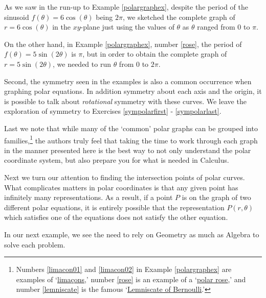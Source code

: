 \documentclass{ximera}
\begin{document}
As we saw in the run-up to Example \ref{polargraphex}, despite the period of the sinusoid  $f(\theta) = 6\cos(\theta)$ being $2\pi$, we sketched the complete graph of $r = 6\cos(\theta)$ in the $xy$-plane just using the values of $\theta$ as $\theta$ ranged from $0$ to $\pi$.   


On the other hand, in Example \ref{polargraphex}, number \ref{rose}, the period of $f(\theta) = 5\sin(2\theta)$ is $\pi$, but in order to obtain the complete graph of $r = 5\sin(2\theta)$, we needed to run $\theta$ from $0$ to $2\pi$.  

Second, the symmetry seen in the examples is also a common occurrence when graphing polar equations.  In addition symmetry about each axis and the origin, it is possible to talk about \textit{rotational} symmetry with these curves.  We leave the exploration of symmetry to Exercises \ref{sympolarfirst} - \ref{sympolarlast}. 

Last we note that while many of the    `common' polar graphs can be grouped into families,\footnote{Numbers \ref{limacon01} and \ref{limacon02} in Example \ref{polargraphex} are examples of `\href{http://en.wikipedia.org/wiki/Limacon}{\underline{lima\c{c}ons}},' number \ref{rose} is an example of a `\href{http://en.wikipedia.org/wiki/Rose_(mathematics)}{\underline{polar rose}},' and number \ref{lemniscate} is the famous `\href{http://en.wikipedia.org/wiki/Lemniscate_of_Bernoulli}{\underline{Lemniscate of Bernoulli}}.'} the authors truly feel that taking the time to work through each graph in the manner presented here is the best way to not only understand the polar coordinate system, but also prepare you for what is needed in Calculus.  


 Next we turn our attention to finding the intersection points of polar curves.  What complicates matters in polar coordinates is that any given point has infinitely many representations.  As a result, if a point $P$ is on the graph of two different polar equations, it is entirely possible that the representation $P(r,\theta)$ which satisfies one of the equations does not satisfy the other equation.
 
 In our next example, we see the need to rely on Geometry as much as Algebra to solve each problem.
\end{document}
